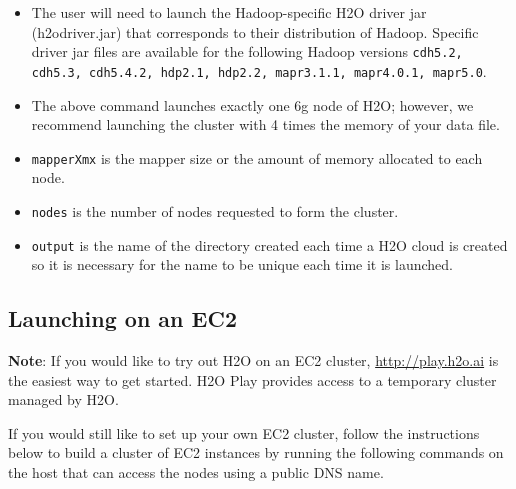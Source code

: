 \begin{itemize}
\item The user will need to launch the Hadoop-specific H2O driver jar (h2odriver.jar) that corresponds to their distribution of Hadoop. Specific driver jar files are available for the following Hadoop versions {\texttt{cdh5.2, cdh5.3, cdh5.4.2, hdp2.1, hdp2.2, mapr3.1.1, mapr4.0.1, mapr5.0}}.
\item The above command launches exactly one 6g node of H2O; however,  we recommend launching the cluster with 4 times the memory of your data file.
\item{\texttt{mapperXmx}} is the mapper size or the amount of memory allocated to each node.
\item{\texttt{nodes}} is the number of nodes requested to form the cluster.
\item{\texttt{output}} is the name of the directory created each time a H2O cloud is created so it is necessary for the name to be unique each time it is launched.
\end{itemize}


\subsection{Launching on an EC2}

{\textbf{Note}}: If you would like to try out H2O on an EC2 cluster, {\url{http://play.h2o.ai}} is the easiest way to get started. H2O Play provides access to a temporary cluster managed by H2O. 

If you would still like to set up your own EC2 cluster, follow the instructions below to build a cluster of EC2 instances by running the following commands on the host that can access the nodes using a public DNS name. 

